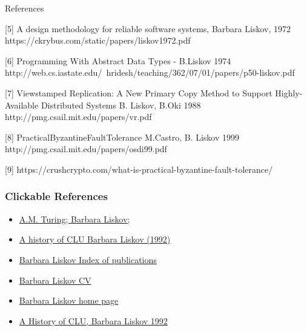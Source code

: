 \documentclass{beamer}
\begin{document}
\begin{frame}{References}

[5] {A  design  methodology  for  reliable  software   systems, Barbara Liskov, 1972} https://ckrybus.com/static/papers/liskov1972.pdf 

\vspace{1mm}

[6] {Programming With Abstract Data Types - B.Liskov 1974}
http://web.cs.iastate.edu/~hridesh/teaching/362/07/01/papers/p50-liskov.pdf

\vspace{1mm}

[7] {Viewstamped Replication: A New Primary Copy Method to Support Highly-Available Distributed Systems B. Liskov, B.Oki 1988}
http://pmg.csail.mit.edu/papers/vr.pdf

\vspace{1mm}

[8] {PracticalByzantineFaultTolerance M.Castro, B. Liskov 1999} http://pmg.csail.mit.edu/papers/osdi99.pdf

\vspace{1mm}

[9] https://crushcrypto.com/what-is-practical-byzantine-fault-tolerance/


\end{frame}




\begin{frame}
\frametitle{Clickable References}
\begin{itemize}
\item \href{https://amturing.acm.org/award_winners/liskov_1108679.cfm}{ A.M. Turing; Barbara Liskov;} 

\item \href {https://dl.acm.org/doi/abs/10.1145/155360.155367}{A history of CLU Barbara Liskov (1992)}

\item \href{https://dblp.uni-trier.de/pid/l/BarbaraLiskov.html}{Barbara Liskov Index of publications}

\item \href{http://www.pmg.csail.mit.edu/~liskov/newcv-09.pdf}{Barbara Liskov CV}

\item \href{http://www.pmg.csail.mit.edu/~liskov/}{Barbara Liskov home page}

\item \href{https://citeseerx.ist.psu.edu/viewdoc/download?doi=10.1.1.46.9499&rep=rep1&type=pdf}{A History of CLU, Barbara Liskov 1992}
\end{itemize}
\end{frame}
\end{document}

